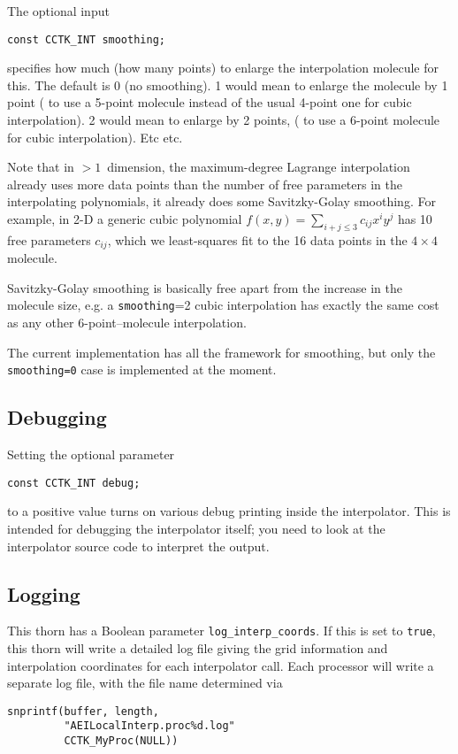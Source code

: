 The optional input
\begin{verbatim}
const CCTK_INT smoothing;
\end{verbatim}
specifies how much (how many points) to enlarge the interpolation
molecule for this.  The default is 0 (no smoothing).  1 would mean to
enlarge the molecule by 1 point (\eg{} to use a 5-point molecule instead
of the usual 4-point one for cubic interpolation).  2 would mean to
enlarge by 2 points, (\eg{} to use a 6-point molecule for cubic
interpolation).  Etc etc.

Note that in $>1$~dimension, the maximum-degree Lagrange interpolation
already uses more data points than the number of free parameters in
the interpolating polynomials, \ie{} it already does some Savitzky-Golay
smoothing.  For example, in 2-D a generic cubic polynomial
$f(x,y) = \sum_{i+j \le 3} c_{ij} x^i y^j$ has 10 free parameters
$c_{ij}$, which we least-squares fit to the 16 data points in the
$4 \times 4$ molecule.

Savitzky-Golay smoothing is basically free apart from the increase in
the molecule size, e.g. a \verb|smoothing|=2 cubic interpolation has
exactly the same cost as any other 6-point--molecule interpolation.

The current implementation has all the framework for smoothing, but
only the \verb|smoothing=0| case is implemented at the moment.


\subsection{Debugging}

Setting the optional parameter
\begin{verbatim}
const CCTK_INT debug;
\end{verbatim}
to a positive value turns on various debug printing inside the
interpolator.  This is intended for debugging the interpolator itself;
you need to look at the interpolator source code to interpret the output.


\subsection{Logging}

This thorn has a Boolean parameter \verb|log_interp_coords|.
If this is set to \verb|true|, this thorn will write a detailed log
file giving the grid information and interpolation coordinates for
each interpolator call.  Each processor will write a separate log file,
with the file name determined via
\begin{verbatim}
snprintf(buffer, length,
         "AEILocalInterp.proc%d.log"
         CCTK_MyProc(NULL))
\end{verbatim}

